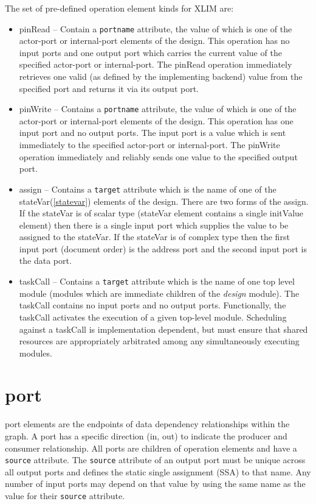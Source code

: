 The set of pre-defined operation element kinds for XLIM are:\\
\begin{itemize}
\item pinRead\label{pinread} -- Contain a {\tt portname} attribute, the value of which is one of the actor-port or internal-port elements of the design.  This operation has no input ports and one output port which carries the current value of the specified actor-port or internal-port.  The pinRead operation immediately retrieves one valid (as defined by the implementing backend) value from the specified port and returns it via its output port.
\item pinWrite\label{pinwrite} -- Contains a {\tt portname} attribute, the value of which is one of the actor-port or internal-port elements of the design.  This operation has one input port and no output ports.  The input port is a value which is sent immediately to the specified actor-port or internal-port.  The pinWrite operation immediately and reliably sends one value to the specified output port.
\item assign\label{assignoperation} -- Contains a {\tt target} attribute which is the name of one of the stateVar(\ref{statevar}) elements of the design.  There are two forms of the assign.  If the stateVar is of scalar type (stateVar element contains a single initValue element) then there is a single input port which supplies the value to be assigned to the stateVar.  If the stateVar is of complex type then the first input port (document order) is the address port and the second input port is the data port.  
\item taskCall\label{taskcall} -- Contains a {\tt target} attribute which is the name of one top level module (modules which are immediate children of the {\it design} module).  The taskCall contains no input ports and no output ports.  Functionally, the taskCall activates the execution of a given top-level module.  Scheduling against a taskCall is implementation dependent, but must ensure that shared resources are appropriately arbitrated among any simultaneously executing modules.
\end{itemize}
  
\section{port}\label{port}
port elements are the endpoints of data dependency relationships within the graph.  A port has
a specific direction (in, out) to indicate the producer and consumer relationship.  All ports
are children of operation elements and have a {\tt source} attribute.  The {\tt source} attribute
of an output port must be unique across all output ports and defines the static single
assignment (SSA) to that name.  Any number of input ports may depend on that value by using the
same name as the value for their {\tt source} attribute.


